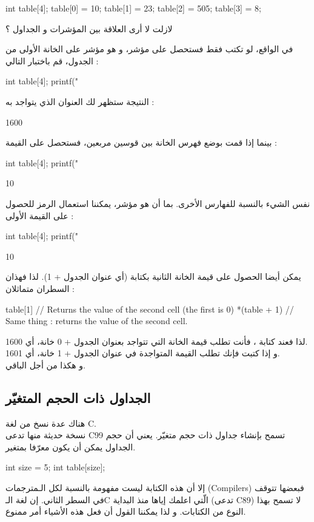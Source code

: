 \begin{Csource}
int table[4];
table[0] = 10;
table[1] = 23;
table[2] = 505;
table[3] = 8;
\end{Csource}
\begin{question}
  لازلت لا أرى العلاقة بين المؤشرات و الجداول ؟
\end{question}
في الواقع، لو تكتب فقط
فستحصل على مؤشر، و هو مؤشر على الخانة الأولى من الجدول، قم باختبار التالي :
\begin{Csource}
int table[4];
printf("%
\end{Csource}
النتيجة ستظهر لك العنوان الذي يتواجد به
 :
\begin{Console}
1600
\end{Console}
بينما إذا قمت بوضع فهرس الخانة بين قوسين مربعين، فستحصل على القيمة :
\begin{Csource}
int table[4];
printf("%
\end{Csource}
\begin{Console}
10
\end{Console}
نفس الشيء بالنسبة للفهارس الأخرى. بما أن
هو مؤشر، يمكننا استعمال الرمز
\InlineCode{*}
للحصول على القيمة الأولى :
\begin{Csource}
int table[4];
printf("%
\end{Csource}
\begin{Console}
10
\end{Console}
يمكن أيضا الحصول على قيمة الخانة الثانية بكتابة
(أي عنوان الجدول + 1). لذا فهذان السطران متماثلان :
\begin{Csource}
table[1] // Returns the value of the second cell (the first is 0)
*(table + 1) // Same thing : returns the value of the second cell.
\end{Csource}
لذا فعند كتابة
،
فأنت تطلب قيمة الخانة التي تتواجد بعنوان الجدول + 0
خانة، أي 1600.\\
و إذا كتبت
فإنك تطلب القيمة المتواجدة في عنوان الجدول + 1
خانة، أي 1601.\\
و هكذا من أجل الباقي.

\subsection{الجداول ذات الحجم المتغيّر}
هناك عدة نسخ من لغة
\textenglish{C}.\\
نسخة حديثة منها تدعى
\textenglish{C99}
تسمح بإنشاء جداول ذات حجم متغيّر. يعني أن حجم الجداول يمكن أن يكون معرّفا بمتغير.
\begin{Csource}
int size = 5;
int table[size];
\end{Csource}
إلا أن هذه الكتابة ليست مفهومة بالنسبة لكل الـمترجمات
(\textenglish{Compilers})
فبعضها تتوقف في السطر الثاني. إن لغة
الـ\textenglish{C}
الّتي اعلمك إياها منذ البداية (تدعى
\textenglish{C89})
لا تسمح بهذا النوع من الكتابات. و لذا يمكننا القول أن فعل هذه الأشياء أمر ممنوع.

